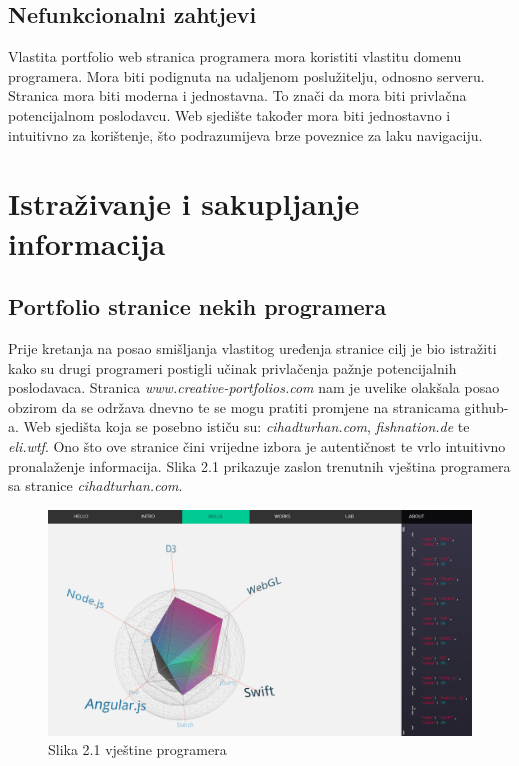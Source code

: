 \documentclass[times, utf8, zavrsni, numeric]{fer}
\begin{document}
\subsection{Nefunkcionalni zahtjevi}
\qquad Vlastita portfolio web stranica programera mora koristiti vlastitu domenu programera.
Mora biti podignuta na udaljenom poslužitelju, odnosno serveru.
Stranica mora biti moderna i jednostavna.
To znači da mora biti privlačna potencijalnom poslodavcu.
Web sjedište također mora biti jednostavno i intuitivno za korištenje, što podrazumijeva brze poveznice za laku navigaciju.

\section{Istraživanje i sakupljanje informacija}
\subsection{Portfolio stranice nekih programera}
\qquad Prije kretanja na posao smišljanja vlastitog uređenja stranice cilj je bio istražiti kako su drugi programeri postigli učinak privlačenja pažnje potencijalnih poslodavaca.
Stranica \textit{www.creative-portfolios.com} nam je uvelike olakšala posao obzirom da se održava dnevno te se mogu pratiti promjene na stranicama github-a.
Web sjedišta koja se posebno ističu su: \textit{cihadturhan.com}, \textit{fishnation.de} te \textit{eli.wtf}.
Ono što ove stranice čini vrijedne izbora je autentičnost te vrlo intuitivno pronalaženje informacija. Slika 2.1 prikazuje zaslon trenutnih vještina programera sa stranice \textit{cihadturhan.com}.

\begin{figure}[htb]
				\includegraphics[width=14.6cm]{images/skills.png}
				\caption{Slika 2.1 vještine programera}
				\label{fig:skills}
\end{figure}
\end{document}
